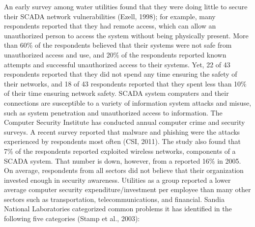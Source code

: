 \documentclass{article}
\begin{document}
An early survey among water utilities found that they were doing little
to secure their SCADA network vulnerabilities (Ezell, 1998); for
example, many respondents reported that they had remote access, which
can allow an unauthorized person to access the system without being
physically present. More than 60\% of the respondents believed that
their systems were not safe from unauthorized access and use, and 20\%
of the respondents reported known attempts and successful unauthorized
access to their systems. Yet, 22 of 43 respondents reported that they
did not spend any time ensuring the safety of their networks, and 18 of
43 respondents reported that they spent less than 10\% of their time
ensuring network safety. SCADA system computers and their connections
are susceptible to a variety of information system attacks and misuse,
such as system penetration and unauthorized access to information. The
Computer Security Institute has conducted annual computer crime and
security surveys. A recent survey reported that malware and phishing
were the attacks experienced by respondents most often (CSI, 2011). The
study also found that 7\% of the respondents reported exploited wireless
networks, components of a SCADA system. That number is down, however,
from a reported 16\% in 2005. On average, respondents from all sectors
did not believe that their organization invested enough in security
awareness. Utilities as a group reported a lower average computer
security expenditure/investment per employee than many other sectors
such as transportation, telecommunications, and financial. Sandia
National Laboratories categorized common problems it has identified in
the following five categories (Stamp et al., 2003):
\end{document}
